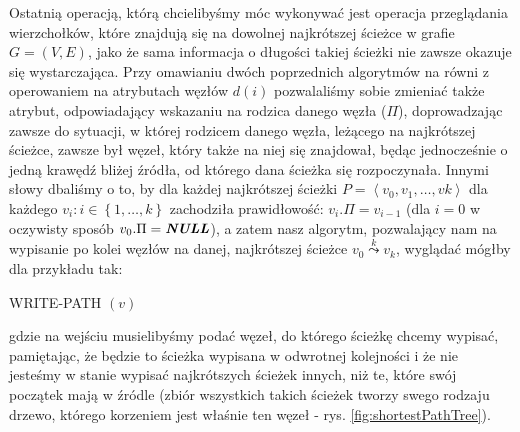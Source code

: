 Ostatnią operacją, którą chcielibyśmy móc wykonywać jest operacja przeglądania wierzchołków, które znajdują się na dowolnej najkrótszej ścieżce w grafie $G = \left( V, E \right)$, jako że sama informacja o długości takiej ścieżki nie zawsze okazuje się wystarczająca. Przy omawianiu dwóch poprzednich algorytmów na równi z operowaniem na atrybutach węzłów $d \left( i \right)$ pozwalaliśmy sobie zmieniać także atrybut, odpowiadający wskazaniu na rodzica danego węzła ($\Pi$), doprowadzając zawsze do sytuacji, w której rodzicem danego węzła, leżącego na najkrótszej ścieżce, zawsze był węzeł, który także na niej się znajdował, będąc jednocześnie o jedną krawędź bliżej źródła, od którego dana ścieżka się rozpoczynała. Innymi słowy dbaliśmy o to, by dla każdej najkrótszej ścieżki $ P = \left \langle v_{0}, v_{1}, \ldots, v{k} \right \rangle$ dla każdego $v_{i} : i \in \left\{ 1, \ldots, k \right\}$ zachodziła prawidłowość: $v_{i}.\Pi = v_{i-1}$ (dla $i = 0$ w oczywisty sposób $v_{0}.\Pi = \emph{\textbf{NULL}}$), a zatem nasz algorytm, pozwalający nam na wypisanie po kolei węzłów na danej, najkrótszej ścieżce $v_{0} \overset{k} \leadsto v_{k}$, wyglądać mógłby dla przykładu tak:

\begin{algorithm}[!htbp]
\DontPrintSemicolon
{}
\caption{WRITE-PATH $\left( v \right)$ \label{alg:writePAth}}
\end{algorithm}

gdzie na wejściu musielibyśmy podać węzeł, do którego ścieżkę chcemy wypisać, pamiętając, że będzie to ścieżka wypisana w odwrotnej kolejności i że nie jesteśmy w stanie wypisać najkrótszych ścieżek innych, niż te, które swój początek mają w źródle (zbiór wszystkich takich ścieżek tworzy swego rodzaju drzewo, którego korzeniem jest właśnie ten węzeł - rys. \ref{fig:shortestPathTree}).

